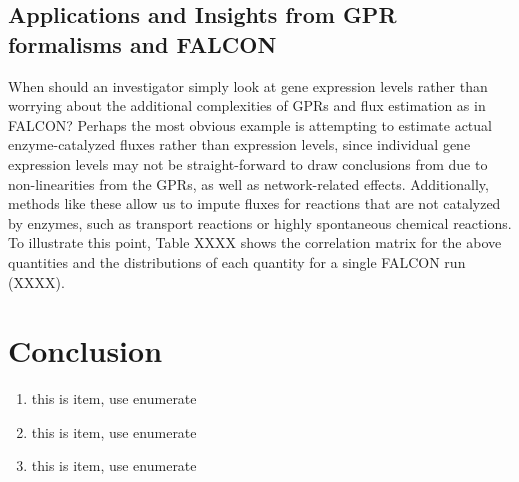 \subsection{Applications and Insights from GPR formalisms and FALCON}
When should an investigator simply look at gene expression levels rather than
worrying about the additional complexities of GPRs and flux estimation as in FALCON?
Perhaps the most obvious example is attempting to estimate actual enzyme-catalyzed 
fluxes rather than expression levels, since individual gene expression levels
may not be straight-forward to draw conclusions from due to non-linearities
from the GPRs, as well as network-related effects. Additionally, methods like these
allow us to impute fluxes for reactions that are not catalyzed by enzymes,
such as transport reactions or highly spontaneous chemical reactions. To illustrate
this point, Table XXXX shows the correlation matrix for the above quantities and 
the distributions of each quantity for a single FALCON run (XXXX).




%
%


\section{Conclusion}


\begin{enumerate}
\item this is item, use enumerate
\item this is item, use enumerate
\item this is item, use enumerate
\end{enumerate}

